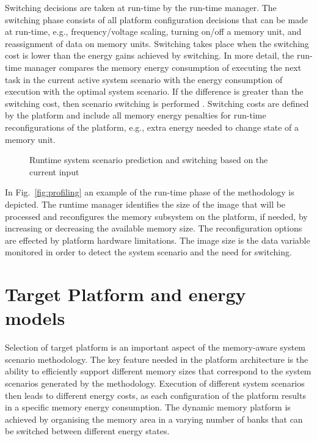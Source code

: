 \documentclass{acm_proc_article-sp}
\begin{document}
Switching decisions are taken at run-time by the run-time manager. The switching phase consists of all platform configuration decisions that can be made at run-time, e.g., frequency/voltage scaling, turning on/off a memory unit, and reassignment of data on memory units. Switching takes place when the switching cost is lower than the energy gains achieved by switching. In more detail, the run-time manager compares the memory energy consumption of executing the next task in the current active system scenario with the energy consumption of execution with the optimal system scenario. If the difference is greater than the switching cost, then scenario switching is performed \cite{tcm}. Switching costs are defined by the platform and include all memory energy penalties for run-time reconfigurations of the platform, e.g., extra energy needed to change state of a memory unit.

\begin{figure}[!t]
\centering
\caption{Runtime system scenario prediction and switching based on the current input}
\label{fig:runtime}
\end{figure}

In Fig.~\ref{fig:profiling} an example of the run-time phase of the methodology is depicted. The runtime manager identifies the size of the image that will be processed and reconfigures the memory subsystem on the platform, if needed, by increasing or decreasing the available memory size. The reconfiguration options are effected by platform hardware limitations. The image size is the data variable monitored in order to detect the system scenario and the need for switching.

\section{Target Platform and energy \\ models}
\label{sec:platform}

Selection of target platform is an important aspect of the memory-aware system scenario methodology. The key feature needed in the platform architecture is the ability to efficiently support different memory sizes that correspond to the system scenarios generated by the methodology. Execution of different system scenarios then leads to different energy costs, as each configuration of the platform results in a specific memory energy consumption. The dynamic memory platform is achieved by organising the memory area in a varying number of banks that can be switched between different energy states. 
\end{document}
